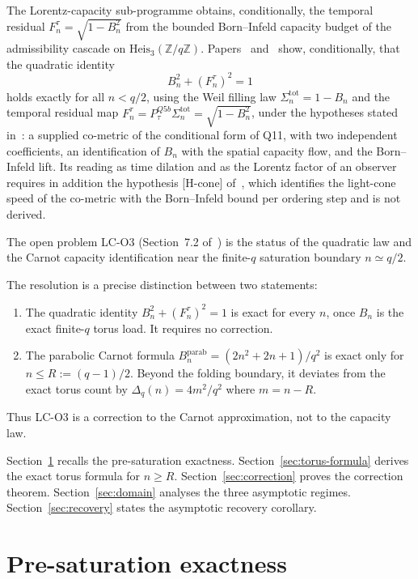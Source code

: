 \documentclass[12pt,a4paper]{article}
\theoremstyle{remark}
\begin{document}
    The Lorentz-capacity sub-programme obtains, conditionally, the temporal residual
    $F^\tau_n = \sqrt{1-B_n^2}$ from the bounded Born--Infeld capacity budget of the
    admissibility cascade on $\mathrm{Heis}_3(\mathbb{Z}/q\mathbb{Z})$.
    Papers~\cite{Beau2026n} and~\cite{Beau2026tp} show, conditionally, that the quadratic identity
    \[
      B_n^2 + (F^\tau_n)^2 = 1
    \]
    holds exactly for all $n < q/2$, using the Weil filling law $\Sigma^{\mathrm{tot}}_n =
  1-B_n$ and the temporal residual map $F^\tau_n = P^{Q5b}_\tau \Sigma^{\mathrm{tot}}_n
  = \sqrt{1-B_n^2}$, under the hypotheses stated in~\cite{Beau2026tp}: a supplied co-metric of the conditional
  form of Q11, with two independent coefficients, an identification of $B_n$ with the spatial capacity flow, and
  the Born--Infeld lift.
    Its reading as time dilation and as the Lorentz factor of an observer requires in addition the hypothesis
    [H-cone] of~\cite{Beau2026tp}, which identifies the light-cone speed of the co-metric with the Born--Infeld
    bound per ordering step and is not derived.

    The open problem LC-O3 (Section~7.2 of~\cite{Beau2026tp}) is the status of the
    quadratic law and the Carnot capacity identification near the finite-$q$ saturation
    boundary $n \simeq q/2$.

    The resolution is a precise distinction between two statements:
    \begin{enumerate}
      \item The quadratic identity $B_n^2 + (F^\tau_n)^2 = 1$ is exact for every $n$, once
      $B_n$ is the exact finite-$q$ torus load.
      It requires no correction.
      \item The parabolic Carnot formula $B_n^{\mathrm{parab}} = (2n^2+2n+1)/q^2$ is exact
      only for $n \leq R := (q-1)/2$.
      Beyond the folding boundary, it deviates from the exact torus count by
      $\Delta_q(n) = 4m^2/q^2$ where $m = n-R$.
    \end{enumerate}
    Thus LC-O3 is a correction to the Carnot approximation, not to the capacity law.

    Section~\ref{sec:pre-saturation} recalls the pre-saturation exactness.
    Section~\ref{sec:torus-formula} derives the exact torus formula for $n \geq R$.
    Section~\ref{sec:correction} proves the correction theorem.
    Section~\ref{sec:domain} analyses the three asymptotic regimes.
    Section~\ref{sec:recovery} states the asymptotic recovery corollary.

  \section{Pre-saturation exactness}
    \label{sec:pre-saturation}
\end{document}
